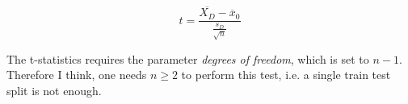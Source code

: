 \documentclass[12pt,a4paper]{article}
\begin{document}
\[t = \frac{\overline{X_D} - \overline{x}_0}{\frac{s_D}{\sqrt{n}}}\]

\noindent The t-statistics requires the parameter \textit{degrees of freedom}, which is set to \(n - 1\). Therefore I think, one needs \(n \geq 2\) to perform this test, i.e. a single train test split is not enough.


\newpage
\printbibliography
\end{document}
